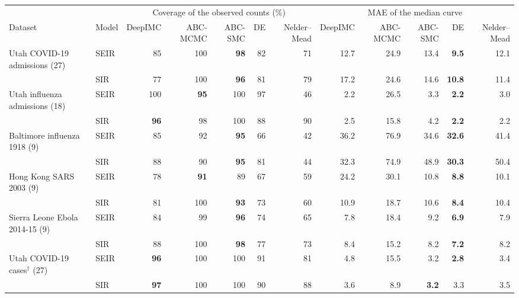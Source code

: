\begin{tabular}{llrrrrrrrrrr}
\toprule
 &  & \multicolumn{5}{c}{Coverage of the observed counts (\%)} & \multicolumn{5}{c}{MAE of the median curve} \\
\cmidrule(lr){3-7}\cmidrule(lr){8-12}
Dataset & Model & DeepIMC & ABC-MCMC & ABC-SMC & DE & Nelder--Mead & DeepIMC & ABC-MCMC & ABC-SMC & DE & Nelder--Mead \\
\midrule
Utah COVID-19 admissions (27) & SEIR & 85 & 100 & \textbf{98} & 82 & 71 & 12.7 & 24.9 & 13.4 & \textbf{9.5} & 12.1 \\
 & SIR & 77 & 100 & \textbf{96} & 81 & 79 & 17.2 & 24.6 & 14.6 & \textbf{10.8} & 11.4 \\
Utah influenza admissions (18) & SEIR & 100 & \textbf{95} & 100 & 97 & 46 & 2.2 & 26.5 & 3.3 & \textbf{2.2} & 3.0 \\
 & SIR & \textbf{96} & 98 & 100 & 88 & 90 & 2.5 & 15.8 & 4.2 & \textbf{2.2} & 2.2 \\
Baltimore influenza 1918 (9) & SEIR & 85 & 92 & \textbf{95} & 66 & 42 & 36.2 & 76.9 & 34.6 & \textbf{32.6} & 41.4 \\
 & SIR & 88 & 90 & \textbf{95} & 81 & 44 & 32.3 & 74.9 & 48.9 & \textbf{30.3} & 50.4 \\
Hong Kong SARS 2003 (9) & SEIR & 78 & \textbf{91} & 89 & 67 & 59 & 24.2 & 30.1 & 10.8 & \textbf{8.8} & 10.1 \\
 & SIR & 81 & 100 & \textbf{93} & 73 & 60 & 10.9 & 18.7 & 10.6 & \textbf{8.4} & 10.4 \\
Sierra Leone Ebola 2014-15 (9) & SEIR & 84 & 99 & \textbf{96} & 74 & 65 & 7.8 & 18.4 & 9.2 & \textbf{6.9} & 7.9 \\
 & SIR & 88 & 100 & \textbf{98} & 77 & 73 & 8.4 & 15.2 & 8.2 & \textbf{7.2} & 8.2 \\
Utah COVID-19 cases$^\dagger$ (27) & SEIR & \textbf{96} & 100 & 100 & 91 & 81 & 4.8 & 15.5 & 3.2 & \textbf{2.8} & 3.4 \\
 & SIR & \textbf{97} & 100 & 100 & 90 & 88 & 3.6 & 8.9 & \textbf{3.2} & 3.3 & 3.5 \\
\bottomrule
\end{tabular}
